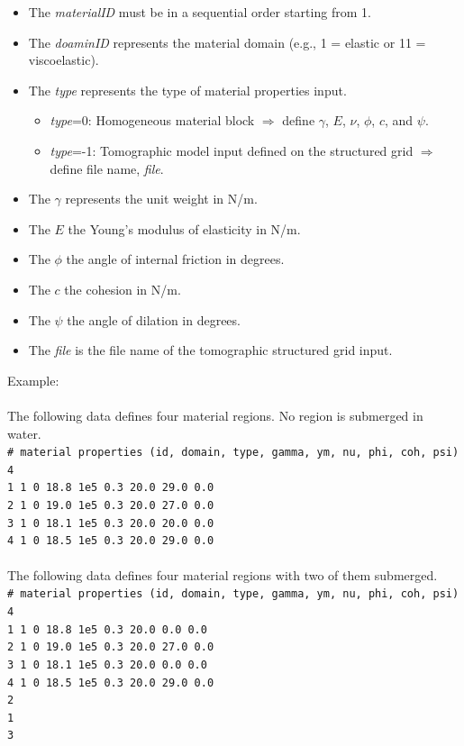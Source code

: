 \begin{itemize}
 \item The \emph{materialID} must be in a sequential order starting from 1.
 \item The \emph{doaminID} represents the material domain (e.g., 1 = elastic or 11 = viscoelastic).
 \item The \emph{type} represents the type of material properties input.
 \begin{itemize}
  \item \emph{type}=0: Homogeneous material block $\Rightarrow$ define $\gamma$, $E$, $\nu$, $\phi$, $c$, and $\psi$.
  \item \emph{type}=-1: Tomographic model input defined on the structured grid $\Rightarrow$ define file name, \emph{file}.
  \end{itemize}

  \item The $\gamma$ represents the unit weight in N/m.
  \item The $E$ the Young's modulus of elasticity in N/m.
  \item The $\phi$ the angle of internal friction in degrees.
  \item The $c$ the cohesion in N/m.
  \item The $\psi$ the angle of dilation in degrees.
  \item The \emph{file} is the file name of the tomographic structured grid input.
\end{itemize}

Example:\\
\\
The following data defines four material regions. No region is submerged in water.\\

\texttt{\# material properties (id, domain, type, gamma, ym, nu, phi, coh, psi)\\
4\\
1 1 0 18.8 1e5 0.3 20.0 29.0 0.0\\
2 1 0 19.0 1e5 0.3 20.0 27.0 0.0\\
3 1 0 18.1 1e5 0.3 20.0 20.0 0.0\\
4 1 0 18.5 1e5 0.3 20.0 29.0 0.0\\
}\\

The following data defines four material regions with two of them submerged.\\

\texttt{\# material properties (id, domain, type, gamma, ym, nu, phi, coh, psi)\\
4\\
1 1 0 18.8 1e5 0.3 20.0 0.0 0.0\\
2 1 0 19.0 1e5 0.3 20.0 27.0 0.0\\
3 1 0 18.1 1e5 0.3 20.0 0.0 0.0\\
4 1 0 18.5 1e5 0.3 20.0 29.0 0.0\\
2\\
1\\
3\\
}\\

